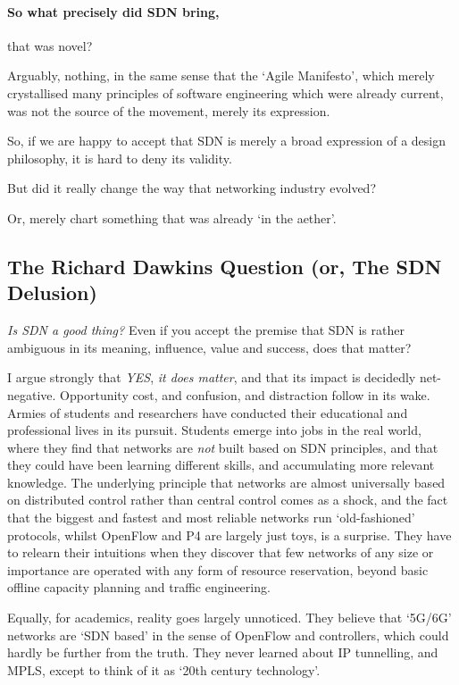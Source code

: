 \paragraph{So what precisely did SDN bring,} that was novel?

Arguably, nothing, in the same sense that the ‘Agile Manifesto’, which merely crystallised many principles of software engineering which were already current, was not the source of the movement, merely its expression.

So, if we are happy to accept that SDN is merely a broad expression of a design philosophy, it is hard to deny its validity.

But did it really change the way that networking industry evolved?

Or, merely chart something that was already ‘in the aether’.

\subsection{The Richard Dawkins  Question (or, The SDN Delusion)}

\textit{Is SDN a good thing?} Even if you accept the premise that SDN is rather ambiguous in its meaning, influence, value and success, does that matter?

I argue strongly that \textit{YES}, \textit{it does matter}, and that its impact is decidedly net-negative.
Opportunity cost, and confusion, and distraction follow in its wake.
Armies of students and researchers have conducted their educational and professional lives in its pursuit.
Students emerge into jobs in the real world, where they find that networks are \textit{not} built based on SDN principles, and that they could have been learning different skills, and accumulating more relevant knowledge.
The underlying principle that networks are almost universally based on distributed control rather than central control comes as a shock, and the fact that the biggest and fastest and most reliable networks run ‘old-fashioned’ protocols, whilst OpenFlow and P4 are largely just toys, is a surprise.
They have to relearn their intuitions when they discover that few networks of any size or importance are operated with any form of resource reservation, beyond basic offline capacity planning and traffic engineering.

Equally, for academics, reality goes largely unnoticed.
They believe that ‘5G/6G’ networks are ‘SDN based’ in the sense of OpenFlow and controllers, which could hardly be further from the truth.
They never learned about IP tunnelling, and MPLS, except to think of it as ‘20th century technology’.

